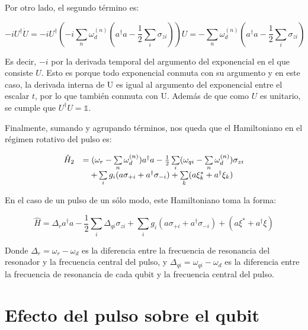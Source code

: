 Por otro lado, el segundo término es:

\begin{equation}
    - i U^\dagger \dot{U} = -i U^\dagger (-i \sum\limits_n \omega_d^{(n)} (a^\dagger a - \frac{1}{2} \sum\limits_i \sigma_{z i})) U = - \sum\limits_n \omega_d^{(n)}(a^\dagger a - \frac{1}{2} \sum\limits_i \sigma_{z i})
\end{equation}

Es decir, $-i$ por la derivada temporal del argumento del exponencial en el que consiste $U$. Esto es porque todo exponencial conmuta con su argumento y en este caso, la derivada interna de U es igual al argumento del exponencial entre el escalar $t$, por lo que también conmuta con U. Además de que como $U$ es unitario, se cumple que $U^\dagger U = \mathds{1}$.

Finalmente, sumando y agrupando términos, nos queda que el Hamiltoniano en el régimen rotativo del pulso es:

\begin{equation}
    \begin{array}{r l}
        \hat{H}_2 &= (\omega_r - \sum\limits_n \omega_d^{(n)}) a^\dag a - \frac{1}{2} \sum\limits_i (\omega_{qi} - \sum\limits_n \omega_d^{(n)}) \sigma_{zi} \\
                  &\quad + \sum\limits_i g_i (a \sigma_{+ i} + a^\dagger \sigma_{- i}) + \sum\limits_k (a\xi_k^* + a^\dagger\xi_k)
    \end{array}
\end{equation}

En el caso de un pulso de un sólo modo, este Hamiltoniano toma la forma:

\begin{equation}
    \hat{H} = \Delta_r a^\dagger a - \frac{1}{2} \sum\limits_i \Delta_{qi} \sigma_{zi} + \sum\limits_i g_i (a \sigma_{+ i} + a^\dagger \sigma_{- i}) + (a\xi^*+a^\dagger\xi )
\end{equation}

Donde $\Delta_r = \omega_r - \omega_d$ es la diferencia entre la frecuencia de resonancia del resonador y la frecuencia central del pulso, y $\Delta_{qi} = \omega_{qi} - \omega_d$ es la diferencia entre la frecuencia de resonancia de cada qubit y la frecuencia central del pulso.

\section{Efecto del pulso sobre el qubit}

